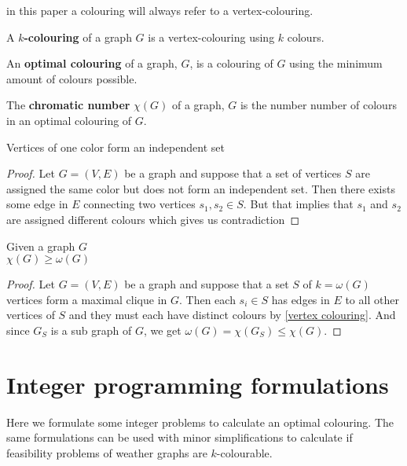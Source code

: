 in this paper a colouring will always refer to a vertex-colouring.
\begin{definition}
A \textbf{$k$-colouring} of a graph $G$ is a vertex-colouring using $k$ colours.
\end{definition}
\begin{definition}\label{cromatic number}
An \textbf{optimal colouring} of a graph, $G$, is a colouring of $G$ using the minimum amount of colours possible.
\end{definition}
\begin{definition}\label{cromatic number}
The \textbf{chromatic number} $\chi (G)$ of a graph, $G$ is the number number of colours in an optimal colouring of $G$.
\end{definition}
\begin{theorem}
Vertices of one color form an independent set
\begin{proof}
Let $G=(V,E)$ be a graph and suppose that a set of vertices $S$ are assigned the same color but does not form an independent set. Then there exists some edge in $E$ connecting two vertices $s_1,s_2 \in S$. But that implies that $s_1$ and $s_2$ are assigned different colours which gives us contradiction
\end{proof}
\end{theorem}
\begin{theorem}
Given a graph $G$\\
$\chi (G) \geq \omega(G)$
\begin{proof}
Let $G=(V,E)$ be a graph and suppose that a set $S$ of $k = \omega(G)$ vertices form a maximal clique in $G$. Then each $s_i \in S$ has edges in $E$ to all other vertices of $S$ and they must each have distinct colours by \ref{vertex colouring}. And since $G_S$ is a sub graph of $G$, we get $\omega(G)= \chi(G_S) \leq \chi(G)$.
\end{proof}
\end{theorem}
\section{Integer programming formulations}
Here we formulate some integer problems to calculate an optimal colouring. The same formulations can be used with minor simplifications to calculate if feasibility problems of weather graphs are $k$-colourable.
